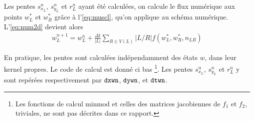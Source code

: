 \documentclass[
	french,
	11pt, %
]{fphw}
\begin{document}
Les pentes $s^n_{x_L}$, $s^n_{y_L}$ et  $r^n_L$ ayant été calculées, on calcule le flux numérique aux points $w^*_L$ et $w^*_R$ grâce à l'\cref{eq:muscl}, qu'on applique au schéma numérique. L'\cref{eq:num2d} devient alors
\begin{align}
	w^{n+1}_L = w^n_L + \frac{\Delta t}{\vert L \vert } \sum_{R\in V(L)} \vert L/R \vert f(w^*_L, w^*_R, n_{LR})
\end{align}

En pratique, les pentes sont calculées indépendamment des états $w$, dans leur kernel propres. 
Le code de calcul est donné ci bas \footnote{Les fonctions de calcul $\text{minmod}$ et celles des matrices jacobiennes de $f_1$ et $f_2$, triviales, ne sont pas décrites dans ce rapport.}. Les pentes $s^n_{x_L}$, $s^n_{y_L}$ et $r^n_L$ y sont repérées respectivement par $\verb|dxwn|$, $\verb|dywn|$, et $\verb|dtwn|$.
\end{document}

